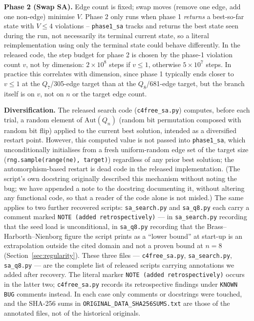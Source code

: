 \documentclass[12pt]{article}
\begin{document}
\noindent\textbf{Phase 2 (Swap SA).}
Edge count is fixed; swap moves (remove one edge, add one non-edge)
minimise $V$. Phase 2 only runs when phase 1 \emph{returns} a
best-so-far state with $V\le4$ violations -- \texttt{phase1\_sa} tracks
and returns the best state seen during the run, not necessarily its
terminal current state, so a literal reimplementation using only the
terminal state could behave differently. In the released code, the
step budget for phase 2 is chosen by the phase-1 violation count $v$,
not by dimension: $2\times10^8$ steps if $v\le1$, otherwise
$5\times10^7$ steps. In practice this correlates with dimension, since
phase 1 typically ends closer to $v\le1$ at the $Q_7$/305-edge target
than at the $Q_8$/681-edge target, but the branch itself is on $v$, not
on $n$ or the target edge count.

\noindent\textbf{Diversification.} The released search code
(\texttt{c4free\_sa.py}) computes, before each trial, a random element of
$\mathrm{Aut}(Q_n)$ (random bit permutation composed with random bit
flip) applied to the current best solution, intended as a diversified
restart point. However, this computed value is not passed into
\texttt{phase1\_sa}, which unconditionally initialises from a fresh
uniform-random edge set of the target size
(\texttt{rng.sample(range(ne), target)}) regardless of any prior best
solution; the automorphism-based restart is dead code in the released
implementation. (The script's own docstring originally described this
mechanism without noting the bug; we have appended a note to the
docstring documenting it, without altering any functional code, so
that a reader of the code alone is not misled.) The same applies to two
further recovered scripts: \texttt{sa\_search.py} and \texttt{sa\_q8.py}
each carry a comment marked \texttt{NOTE (added retrospectively)} --- in
\texttt{sa\_search.py} recording that the seed load is unconditional, in
\texttt{sa\_q8.py} recording that the Brass--Harborth--Nienborg figure the
script prints as a ``lower bound'' at start-up is an extrapolation outside
the cited domain and not a proven bound at $n=8$
(Section~\ref{sec:regularity}). These three files ---
\texttt{c4free\_sa.py}, \texttt{sa\_search.py}, \texttt{sa\_q8.py} --- are the
complete list of released scripts carrying annotations we added after
recovery. The literal marker \texttt{NOTE (added retrospectively)} occurs in
the latter two; \texttt{c4free\_sa.py} records its retrospective findings
under \texttt{KNOWN BUG} comments instead. In each case only comments or
docstrings were touched, and the
SHA-256 sums in \texttt{ORIGINAL\_DATA\_SHA256SUMS.txt} are those of the
annotated files, not of the historical originals.
\end{document}
